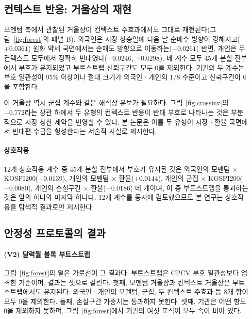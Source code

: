 \subsection{컨텍스트 반응: 거울상의 재현}
\label{sec:alpha}

모멘텀 축에서 관찰된 거울상이 컨텍스트 주효과에서도 그대로
재현된다(그림~\ref{fig:forest}의 패널 B). 외국인은 시장 상승일에 다음 날 순매수
방향이 강해지고($+0.0361$) 원화 약세 국면에서는 순매도 방향으로
이동하는($-0.0261$) 반면, 개인은 두 컨텍스트 모두에서 정확히
반대였다($-0.0246$, $+0.0298$). 네 계수 모두 45개 분할 전부에서 부호가
유지되었고 부트스트랩 신뢰구간도 모두 0을 제외한다. 기관의 두 계수는 부호
일관성이 95\% 이상이나 절대 크기가 외국인ㆍ개인의 $1/8$ 수준이고 신뢰구간이 0을
포함한다.

이 거울상 역시 군집 계수와 같은 해석상 유보가 필요하다.
그림~\ref{fig:crossinv}의 $-0.772$라는 상관 하에서 두 유형의 컨텍스트 반응이
반대 부호로 나타나는 것은 부분적으로 시장 청산 제약을 반영할 수 있다. 본 논문은
이를 두 유형이 시장ㆍ환율 국면에서 반대편 수급을 형성한다는 서술적 사실로
제시한다.

\paragraph{상호작용}
12개 상호작용 계수 중 45개 분할 전부에서 부호가 유지된 것은 외국인의
모멘텀 $\times$ KOSPI200($-0.0139$), 개인의 모멘텀 $\times$ 환율($+0.0144$),
개인의 군집 $\times$ KOSPI200($-0.0080$), 개인의 손실구간 $\times$
환율($-0.0186$) 네 개이며, 이 중 부트스트랩을 통과하는 것은 앞의 하나와 마지막 하나다. 12개 계수를
동시에 검토했으므로 본 연구는 상호작용을 탐색적 결과로만 제시한다.

\subsection{안정성 프로토콜의 결과}
\label{sec:stability}

\paragraph{(V2) 달력월 블록 부트스트랩}
그림~\ref{fig:forest}의 옅은 가로선이 그 결과다. 부트스트랩은 CPCV 부호
일관성보다 엄격한 기준이며, 결과는 셋으로 갈린다. 첫째, 모멘텀 거울상과 컨텍스트
거울상은 부트스트랩에서도 유지된다. 외국인ㆍ개인의 모멘텀, 군집, 두 컨텍스트
주효과 등 8개 항이 모두 0을 제외한다. 둘째, 손실구간 가중치는 통과하지 못한다.
셋째, 기관은 어떤 항도 0을 제외하지 못하며, 그림~\ref{fig:forest}에서 기관의
여섯 표식이 모두 속이 비어 있다.

